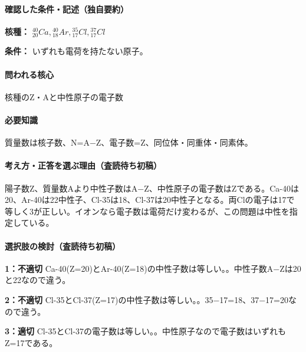 \paragraph{確認した条件・記述（独自要約）}\mbox{}\par

\noindent\textbf{核種：} \({}^{40}_{20}Ca,{}^{40}_{18}Ar,{}^{35}_{17}Cl,{}^{37}_{17}Cl\)\par

\noindent\textbf{条件：} いずれも電荷を持たない原子。\par

\paragraph{問われる核心} 核種のZ・Aと中性原子の電子数

\paragraph{必要知識} 質量数は核子数、N=\allowbreak{}A−Z、電子数=Z、同位体・同重体・同素体。

\paragraph{考え方・正答を選ぶ理由（査読待ち初稿）} 陽子数Z、質量数Aより中性子数はA−Z、中性原子の電子数はZである。Ca-40は20、Ar-40は22中性子、Cl-35は18、Cl-37は20中性子となる。両Clの電子は17で等しく3が正しい。イオンなら電子数は電荷だけ変わるが、この問題は中性を指定している。

\paragraph{選択肢の検討（査読待ち初稿）}\mbox{}\par

\noindent\textbf{1：不適切} Ca-40(Z=\allowbreak{}20)とAr-40(Z=\allowbreak{}18)の中性子数は等しい。。中性子数A−Zは20と22なので違う。\par

\noindent\textbf{2：不適切} Cl-35とCl-37(Z=\allowbreak{}17)の中性子数は等しい。。35−17=\allowbreak{}18、37−17=\allowbreak{}20なので違う。\par

\noindent\textbf{3：適切} Cl-35とCl-37の電子数は等しい。。中性原子なので電子数はいずれもZ=\allowbreak{}17である。\par

